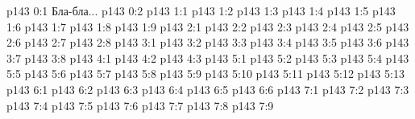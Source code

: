 \author{Промежуточные создания}
\vs p143 0:1  Бла-бла...
\vs p143 0:2 
\vs p143 1:1 
\vs p143 1:2 
\vs p143 1:3 
\vs p143 1:4 
\vs p143 1:5 
\vs p143 1:6 
\vs p143 1:7 
\vs p143 1:8 \pc 
\vs p143 1:9 \pc 
{}
\vs p143 2:1 
\vs p143 2:2 \pc 
\vs p143 2:3 
\vs p143 2:4 
\vs p143 2:5 
\vs p143 2:6 
\vs p143 2:7 
\vs p143 2:8 
\vs p143 3:1 
\vs p143 3:2 
\vs p143 3:3 \pc 
\vs p143 3:4 
\vs p143 3:5 
\vs p143 3:6 
\vs p143 3:7 
\vs p143 3:8 \pc 
{}
\vs p143 4:1 
\vs p143 4:2 
\vs p143 4:3 
\vs p143 5:1 
\vs p143 5:2 
\vs p143 5:3 
\vs p143 5:4 
\vs p143 5:5 
\vs p143 5:6 
\vs p143 5:7 
\vs p143 5:8 
\vs p143 5:9 
\vs p143 5:10 
\vs p143 5:11 
\vs p143 5:12 
\vs p143 5:13 
\vs p143 6:1 
\vs p143 6:2 
\vs p143 6:3 \pc 
\vs p143 6:4 
\vs p143 6:5 
\vs p143 6:6 
\vs p143 7:1 
\vs p143 7:2 \pc 
\vs p143 7:3 \pc 
\vs p143 7:4 \pc 
\vs p143 7:5 \pc 
\vs p143 7:6 \pc 
\vs p143 7:7 \pc 
\vs p143 7:8 \pc 
\vs p143 7:9 \pc 
\quizlink
